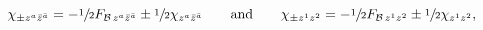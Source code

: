 \begin{equation}
 \chi_{\pm z^a\bar{z}^{\bar{a}}}=-\sfrac{1}{2}
   F_{\mathcal{B}\,z^a\bar{z}^{\bar{a}}}\pm 
 \sfrac{1}{2}\chi_{z^a\bar{z}^{\bar{a}}}
 \qquad \text{and} \qquad
 \chi_{\pm z^1z^2}=-\sfrac{1}{2}F_{\mathcal{B}\,z^1z^2}\pm 
 \sfrac{1}{2}\chi_{z^1z^2},
\end{equation}

